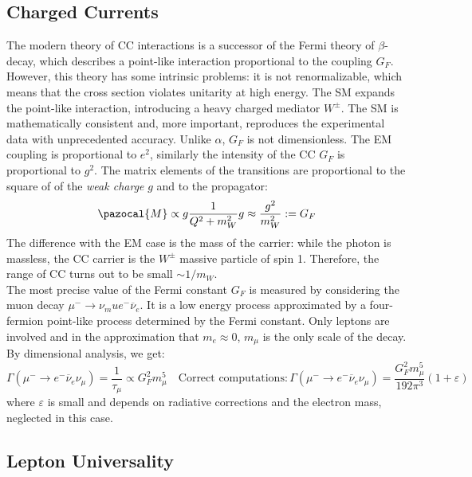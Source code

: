 \documentclass[10.75pt,a4paper,openright,bottom=2cm]{article}
\begin{document}
\subsection{Charged Currents}
The modern theory of CC interactions is a successor of the Fermi theory of $\beta$-decay, which describes a point-like interaction proportional to the coupling $G_F$. However, this theory has some intrinsic problems: it is not renormalizable, which means that the cross section violates unitarity at high energy. The SM expands the point-like interaction, introducing a heavy charged mediator $W^\pm$. The SM is mathematically consistent and, more important, reproduces the experimental data with unprecedented accuracy. Unlike $\alpha$, $G_F$ is not dimensionless. The EM coupling is proportional to $e^2$, similarly the intensity of the CC $G_F$ is proportional to $g^2$. The matrix elements of the transitions are proportional to the square of of the \textit{weak charge} $g$ and to the propagator:
\[
\pazocal{M}\propto g\frac{1}{Q^2+m_W^2}g\approx\frac{g^2}{m_W^2}:=G_F
\]
The difference with the EM case is the mass of the carrier: while the photon is massless, the CC carrier is the $W^\pm$ massive particle of spin 1. Therefore, the range of CC turns out to be small $\sim1/m_W$.\\
The most precise value of the Fermi constant $G_F$ is measured by considering the muon decay $\mu^-\to\nu_mu e^-\overline{\nu}_e$. It is a low energy process approximated by a four-fermion point-like process determined by the Fermi constant. Only leptons are involved and in the approximation that $m_e\approx0$, $m_\mu$ is the only scale of the decay. By dimensional analysis, we get:
\[
\Gamma(\mu^-\to e^-\overline{\nu}_e\nu_\mu)=\frac{1}{\tau_\mu}\propto G_F^2m_\mu^5 \quad \text{Correct computations:}\,\Gamma(\mu^-\to e^-\overline{\nu}_e\nu_\mu)=\frac{G_F^2m_\mu^5}{192\pi^3}(1+\varepsilon)
\]
where $\varepsilon$ is small and depends on radiative corrections and the electron mass, neglected in this case.
\subsection{Lepton Universality}
\end{document}
